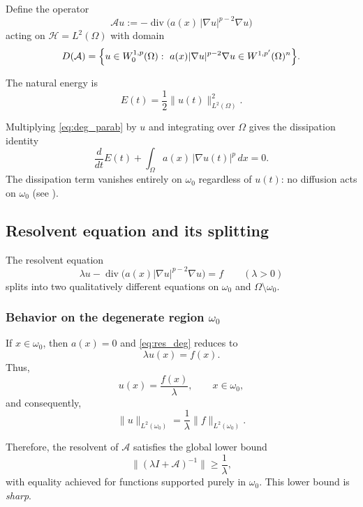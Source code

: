 \documentclass[11pt,reqno]{amsart}
\theoremstyle{remark}
\begin{document}
Define the operator
\[
\mathcal{A}u := -\operatorname{div}\!\bigl(a(x)\,|\nabla u|^{p-2}\nabla u\bigr)
\]
acting on $\mathcal{H}=L^2(\Omega)$ with domain
\[
D(\mathcal{A})=
\Bigl\{u\in W_0^{1,p}(\Omega):\ a(x)|\nabla u|^{p-2}\nabla u\in W^{1,p'}(\Omega)^n\Bigr\}.
\]

The natural energy is
\[
E(t)=\frac12\|u(t)\|_{L^2(\Omega)}^2.
\]

Multiplying \eqref{eq:deg_parab} by $u$ and integrating over $\Omega$
gives the dissipation identity
\begin{equation}\label{eq:parab_energy_identity}
\frac{d}{dt}E(t)
  + \int_\Omega a(x)\,|\nabla u(t)|^{p}\,dx
= 0.
\end{equation}
The dissipation term vanishes entirely on $\omega_0$ regardless of $u(t)$:
no diffusion acts on $\omega_0$ (see \cite{ExamplesandCounter}).

\subsection{Resolvent equation and its splitting}

The resolvent equation
\begin{equation}\label{eq:res_deg}
\lambda u - \operatorname{div}\!\bigl(a(x)|\nabla u|^{p-2}\nabla u\bigr)
   = f
\qquad(\lambda>0)
\end{equation}
splits into two qualitatively different equations on
$\omega_0$ and $\Omega\setminus\omega_0$.

\subsubsection{Behavior on the degenerate region $\omega_0$}

If $x\in \omega_0$, then $a(x)=0$ and \eqref{eq:res_deg} reduces to
\[
\lambda u(x)=f(x).
\]
Thus,
\begin{equation}\label{eq:res_lower_bound_region}
u(x)=\frac{f(x)}{\lambda},
\qquad x\in\omega_0,
\end{equation}
and consequently,
\begin{equation}\label{eq:res_lower_bound}
\|u\|_{L^2(\omega_0)}
 = \frac{1}{\lambda}\|f\|_{L^2(\omega_0)}.
\end{equation}

Therefore, the resolvent of $\mathcal{A}$ satisfies the global lower bound
\[
\|(\lambda I+\mathcal{A})^{-1}\|
  \ge \frac{1}{\lambda},
\]
with equality achieved for functions supported purely in $\omega_0$.
This lower bound is \textit{sharp}.
\end{document}
